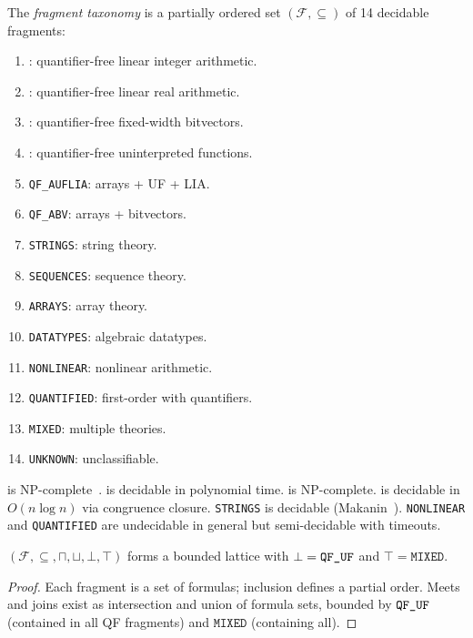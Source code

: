 \documentclass[11pt]{article}
\begin{document}
\begin{definition}\label{def:taxonomy}
The \emph{fragment taxonomy} is a partially ordered set
$(\mathcal{F}, \subseteq)$ of 14 decidable fragments:
\begin{enumerate}[nosep,label=(\arabic*)]
  \item \QFLIA{}: quantifier-free linear integer arithmetic.
  \item \QFLRA{}: quantifier-free linear real arithmetic.
  \item \QFBV{}: quantifier-free fixed-width bitvectors.
  \item \QFUF{}: quantifier-free uninterpreted functions.
  \item \texttt{QF\_AUFLIA}: arrays + UF + LIA.
  \item \texttt{QF\_ABV}: arrays + bitvectors.
  \item \texttt{STRINGS}: string theory.
  \item \texttt{SEQUENCES}: sequence theory.
  \item \texttt{ARRAYS}: array theory.
  \item \texttt{DATATYPES}: algebraic datatypes.
  \item \texttt{NONLINEAR}: nonlinear arithmetic.
  \item \texttt{QUANTIFIED}: first-order with quantifiers.
  \item \texttt{MIXED}: multiple theories.
  \item \texttt{UNKNOWN}: unclassifiable.
\end{enumerate}
\end{definition}

\begin{theorem}\label{thm:decidability}
\QFLIA{} is NP-complete~\cite{schrijver}.
\QFLRA{} is decidable in polynomial time.
\QFBV{} is NP-complete.
\QFUF{} is decidable in $O(n \log n)$ via congruence closure.
\texttt{STRINGS} is decidable (Makanin~\cite{makanin}).
\texttt{NONLINEAR} and \texttt{QUANTIFIED} are undecidable
in general but semi-decidable with timeouts.
\end{theorem}

\begin{lemma}\label{lem:lattice}
$(\mathcal{F}, \subseteq, \sqcap, \sqcup, \bot, \top)$ forms
a bounded lattice with $\bot = \texttt{QF\_UF}$ and $\top = \texttt{MIXED}$.
\end{lemma}

\begin{proof}
Each fragment is a set of formulas; inclusion defines a partial
order.  Meets and joins exist as intersection and union of
formula sets, bounded by $\texttt{QF\_UF}$ (contained in all QF fragments)
and $\texttt{MIXED}$ (containing all).
\end{proof}
\end{document}
